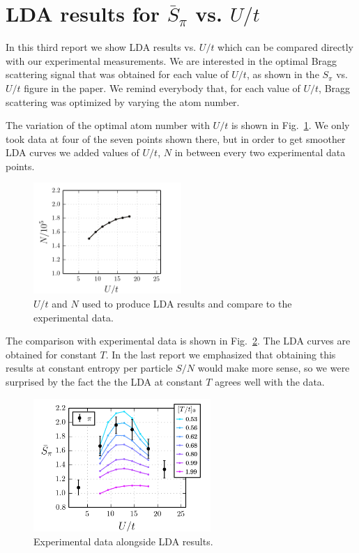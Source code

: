\documentclass[11pt,letter]{article}
\begin{document}
\section{ LDA results for $\bar{S}_{\pi}$ vs. $U/t$ }  

In this third report we show LDA results vs. $U/t$ which can be compared
directly with our experimental measurements.   We are interested in the optimal
Bragg scattering signal that was obtained for each value of $U/t$, as shown in
the $S_{\pi}$ vs. $U/t$ figure in the paper.  We remind everybody that, for
each value of $U/t$, Bragg scattering was optimized by varying the atom number.  

The variation of the optimal atom number with $U/t$ is shown in
Fig.~\ref{fig:udataN}.    We only took data at four of the seven points shown there,
but in order to get smoother LDA curves we added values of $U/t$, $N$ in
between every two experimental data points.

\begin{figure}[H]
    \centering \includegraphics[width=0.5\textwidth]{figures/udataN.png}
\caption{$U/t$ and $N$ used to produce LDA results and compare to the
experimental data. } 
\label{fig:udataN}
\end{figure}

The comparison with experimental data is shown in Fig.~\ref{fig:udata}.  The
LDA curves are obtained for constant $T$.   In the last report we emphasized
that obtaining this results at constant entropy per particle $S/N$ would make
more sense,  so we were surprised by the fact the the LDA at constant $T$
agrees well with the data.   

\begin{figure}[H]
    \centering \includegraphics[width=0.6\textwidth]{figures/udata.png}
\caption{ Experimental data alongside LDA results.} 
\label{fig:udata}
\end{figure}
\end{document}
